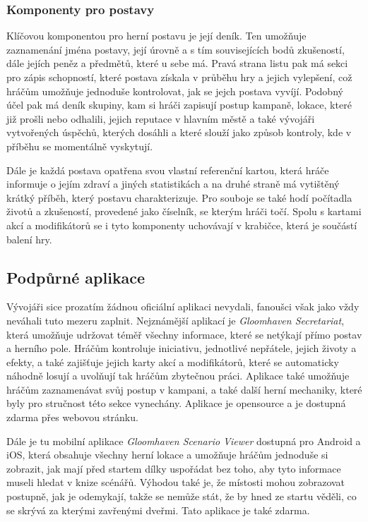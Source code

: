 \subsubsection*{Komponenty pro postavy}
\label{subsubsec:gh_comp_characters}

Klíčovou komponentou pro herní postavu je její deník. Ten umožňuje zaznamenání jména postavy, její úrovně a s tím souvisejících bodů zkušeností, dále jejích peněz a předmětů, které u sebe má. Pravá strana listu pak má sekci pro zápis schopností, které postava získala v průběhu hry a jejich vylepšení, což hráčům umožňuje jednoduše kontrolovat, jak se jejch postava vyvíjí. Podobný účel pak má deník skupiny, kam si hráči zapisují postup kampaně, lokace, které již prošli nebo odhalili, jejich reputace v hlavním městě a také vývojáři vytvořených úspěchů, kterých dosáhli a které slouží jako způsob kontroly, kde v příběhu se momentálně vyskytují.

Dále je každá postava opatřena svou vlastní referenční kartou, která hráče informuje o jejím zdraví a jiných statistikách a na druhé straně má vytištěný krátký příběh, který postavu charakterizuje. Pro souboje se také hodí počítadla životů a zkušeností, provedené jako číselník, se kterým hráči točí. Spolu s kartami akcí a modifikátorů se i tyto komponenty uchovávají v krabičce, která je součástí balení hry.

\subsection{Podpůrné aplikace}
\label{subsec:gh_apps}

Vývojáři sice prozatím žádnou oficiální aplikaci nevydali, fanoušci však jako vždy neváhali tuto mezeru zaplnit. Nejznámější aplikací je \textit{Gloomhaven Secretariat}, která umožňuje udržovat téměř všechny informace, které se netýkají přímo postav a herního pole. Hráčům kontroluje iniciativu, jednotlivé nepřátele, jejich životy a efekty, a také zajišťuje jejich karty akcí a modifikátorů, které se automaticky náhodně losují a uvolňují tak hráčům zbytečnou práci. Aplikace také umožňuje hráčům zaznamenávat svůj postup v kampani, a také další herní mechaniky, které byly pro stručnost této sekce vynechány. Aplikace je opensource a je dostupná zdarma přes webovou stránku.

Dále je tu mobilní aplikace \textit{Gloomhaven Scenario Viewer} dostupná pro Android a iOS, která obsahuje všechny herní lokace a umožňuje hráčům jednoduše si zobrazit, jak mají před startem dílky uspořádat bez toho, aby tyto informace museli hledat v knize scénářů. Výhodou také je, že místosti mohou zobrazovat postupně, jak je odemykají, takže se nemůže stát, že by hned ze startu věděli, co se skrývá za kterými zavřenými dveřmi. Tato aplikace je také zdarma.

